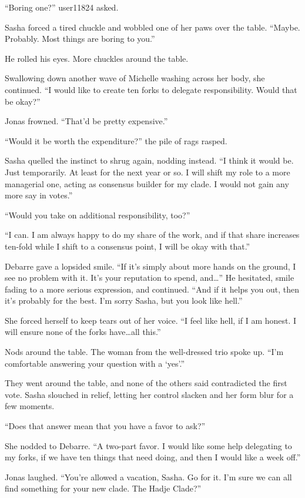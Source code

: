 ``Boring one?'' user11824 asked.

Sasha forced a tired chuckle and wobbled one of her paws over the table. ``Maybe. Probably. Most things are boring to you.''

He rolled his eyes. More chuckles around the table.

Swallowing down another wave of Michelle washing across her body, she continued. ``I would like to create ten forks to delegate responsibility. Would that be okay?''

Jonas frowned. ``That'd be pretty expensive.''

``Would it be worth the expenditure?'' the pile of rags rasped.

Sasha quelled the instinct to shrug again, nodding instead. ``I think it would be. Just temporarily. At least for the next year or so. I will shift my role to a more managerial one, acting as consensus builder for my clade. I would not gain any more say in votes.''

``Would you take on additional responsibility, too?''

``I can. I am always happy to do my share of the work, and if that share increases ten-fold while I shift to a consensus point, I will be okay with that.''

Debarre gave a lopsided smile. ``If it's simply about more hands on the ground, I see no problem with it. It's your reputation to spend, and\ldots{}'' He hesitated, smile fading to a more serious expression, and continued. ``And if it helps you out, then it's probably for the best. I'm sorry Sasha, but you look like hell.''

She forced herself to keep tears out of her voice. ``I feel like hell, if I am honest. I will ensure none of the forks have\ldots all this.''

Nods around the table. The woman from the well-dressed trio spoke up. ``I'm comfortable answering your question with a `yes'.''

They went around the table, and none of the others said contradicted the first vote. Sasha slouched in relief, letting her control slacken and her form blur for a few moments.

``Does that answer mean that you have a favor to ask?''

She nodded to Debarre. ``A two-part favor. I would like some help delegating to my forks, if we have ten things that need doing, and then I would like a week off.''

Jonas laughed. ``You're allowed a vacation, Sasha. Go for it. I'm sure we can all find something for your new clade. The Hadje Clade?''

